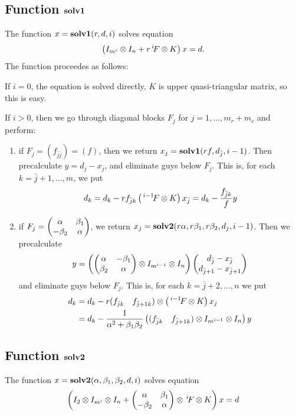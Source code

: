 \documentclass[11pt,a4paper]{article}
\begin{document}
\subsection{Function $\mathbf{solv1}$}

The function $x=\mathbf{solv1}(r,d,i)$ solves equation
$$\left(I_{m^i}\otimes I_n+r\,^i\!F\otimes K\right)x = d.$$
The function proceedes as follows:

If $i=0$, the equation is solved directly, $K$ is upper
quasi-triangular matrix, so this is easy.

If $i>0$, then we go through diagonal blocks $F_j$ for
$j=1,\ldots, m_r+m_c$ and perform:
\begin{enumerate}
\item if $F_j=(f_{\bar j\bar j}) = (f)$, then we return
$x_j=\mathbf{solv1}(rf,d_{\bar j}, i-1)$. Then precalculate $y=d_j-x_j$, and
eliminate guys below $F_j$. This is, for each $k=\bar j+1,\ldots, m$, we
put
$$d_k = d_k-rf_{\bar jk}\left(\,^{i-1}\!F\otimes K\right)x_{\bar j}=
d_k - \frac{f_{\bar jk}}{f}y$$

\item if $F_j=\begin{pmatrix}\alpha&\beta_1\cr -\beta_2&\alpha\end{pmatrix}$,
we return $x_j=\mathbf{solv2}(r\alpha, r\beta_1, r\beta_2, d_j, i-1)$. Then
we precalculate
$$y=\left(\begin{pmatrix}\alpha&-\beta_1\cr \beta_2&\alpha\end{pmatrix}
\otimes I_{m^{i-1}}\otimes I_n\right)
\begin{pmatrix} d_{\bar j} - x_{\bar j}\cr
         d_{\bar j+1} - x_{\bar j+1}
\end{pmatrix}$$
and eliminate guys below $F_j$. This is, for each $k=\bar j+2,\ldots, n$
we put
\begin{align*}
d_k &= d_k - r(f_{{\bar j}k}\quad f_{{\bar j}+1 k})
               \otimes\left(\,^{i-1}\!F\otimes K\right)x_j\\
    &= d_k - \frac{1}{\alpha^2+\beta_1\beta_2}
              \left((f_{{\bar j}k}\quad f_{{\bar j}+1 k})
               \otimes I_{m^{i-1}}\otimes I_n\right)y
\end{align*}

\end{enumerate}

\subsection{Function $\mathbf{solv2}$}

The function $x=\mathbf{solv2}(\alpha, \beta_1, \beta_2, d, i)$ solves
equation
$$
\left(I_2\otimes I_{m^i}\otimes I_n +
\begin{pmatrix}\alpha&\beta_1\cr-\beta_2&\alpha\end{pmatrix}
\otimes\,^i\!F\otimes K\right)x=d
$$
\end{document}

